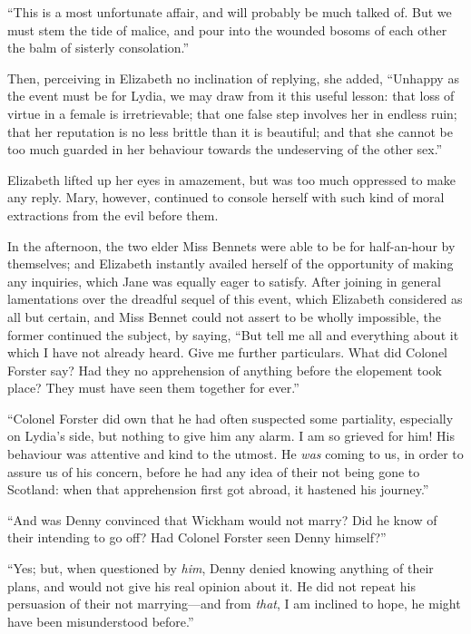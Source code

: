 \documentclass[12pt,english]{book}
\begin{document}
{}``This is a most unfortunate affair, and will probably be much
talked of. But we must stem the tide of malice, and pour into the
wounded bosoms of each other the balm of sisterly consolation.''

Then, perceiving in Elizabeth no inclination of replying, she added,
{}``Unhappy as the event must be for Lydia, we may draw from it this
useful lesson: that loss of virtue in a female is irretrievable; that
one false step involves her in endless ruin; that her reputation is
no less brittle than it is beautiful; and that she cannot be too much
guarded in her behaviour towards the undeserving of the other sex.''

Elizabeth lifted up her eyes in amazement, but was too much oppressed
to make any reply. Mary, however, continued to console herself with
such kind of moral extractions from the evil before them.

In the afternoon, the two elder Miss Bennets were able to be for half-an-hour
by themselves; and Elizabeth instantly availed herself of the opportunity
of making any inquiries, which Jane was equally eager to satisfy.
After joining in general lamentations over the dreadful sequel of
this event, which Elizabeth considered as all but certain, and Miss
Bennet could not assert to be wholly impossible, the former continued
the subject, by saying, {}``But tell me all and everything about
it which I have not already heard. Give me further particulars. What
did Colonel Forster say? Had they no apprehension of anything before
the elopement took place? They must have seen them together for ever.''

{}``Colonel Forster did own that he had often suspected some partiality,
especially on Lydia's side, but nothing to give him any alarm. I am
so grieved for him! His behaviour was attentive and kind to the utmost.
He \textit{was} coming to us, in order to assure us of his concern,
before he had any idea of their not being gone to Scotland: when that
apprehension first got abroad, it hastened his journey.''

{}``And was Denny convinced that Wickham would not marry? Did he
know of their intending to go off? Had Colonel Forster seen Denny
himself?''\ 

{}``Yes; but, when questioned by \textit{him}, Denny denied knowing
anything of their plans, and would not give his real opinion about
it. He did not repeat his persuasion of their not marrying\mbox{---}and
from \textit{that}, I am inclined to hope, he might have been misunderstood
before.''
\end{document}
